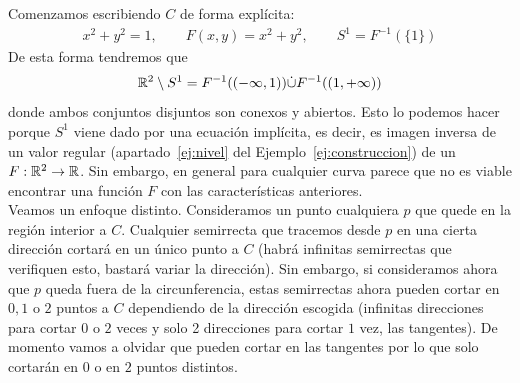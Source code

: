 Comenzamos escribiendo $C$ de forma explícita:
\begin{gather*}
    x^2 + y^2 = 1, \qquad F(x,y) = x^2 + y^2, \qquad S^1 = F^{-1}(\{1\})
\end{gather*}
De esta forma tendremos que 
\begin{gather*}
    \mathbb{R}^2 \setminus S^1 = F^{-1}((-\infty, 1)) \dot{\cup} F^{-1}((1,+\infty))
\end{gather*}
donde ambos conjuntos disjuntos son conexos y abiertos. Esto lo podemos hacer porque $S^1$ viene dado por una ecuación implícita, es decir, es imagen inversa de un valor regular (apartado~\ref{ej:nivel} del Ejemplo~\ref{ej:construccion}) de un $F:\mathbb{R}^2 \to \mathbb{R}$. Sin embargo, en general para cualquier curva parece que no es viable encontrar una función $F$ con las características anteriores.\\

Veamos un enfoque distinto. Consideramos un punto cualquiera $p$ que quede en la región interior a $C$. Cualquier semirrecta que tracemos desde $p$ en una cierta dirección cortará en un único punto a $C$ (habrá infinitas semirrectas que verifiquen esto, bastará variar la dirección). Sin embargo, si consideramos ahora que $p$ queda fuera de la circunferencia, estas semirrectas ahora pueden cortar en $0,1$ o $2$ puntos a $C$ dependiendo de la dirección escogida (infinitas direcciones para cortar $0$ o $2$ veces y solo 2 direcciones para cortar $1$ vez, las tangentes). De momento vamos a olvidar que pueden cortar en las tangentes por lo que solo cortarán en $0$ o en $2$ puntos distintos.

